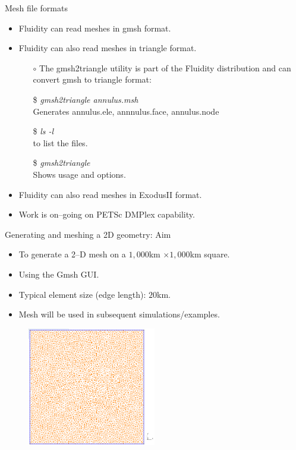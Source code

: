 \documentclass[t]{beamer}
\begin{document}
\begin{frame}{Mesh file formats}
   \begin{itemize}
      \item Fluidity can read meshes in gmsh format.\vspace{10pt}
      \item Fluidity can also read meshes in triangle format.
      \begin{itemize}
         \item[$\circ$] The gmsh2triangle utility is part of the Fluidity distribution and can convert gmsh to triangle format:
         \item[\$] \emph{gmsh2triangle annulus.msh} \\ \hspace{10pt} Generates annulus.ele, annnulus.face, annulus.node
         \item[\$] \emph{ls -l} \\ \hspace{10pt} to list the files.
         \item[\$] \emph{gmsh2triangle} \\ \hspace{10pt} Shows usage and options.\vspace{10pt}
      \end{itemize}
      \item Fluidity can also read meshes in ExodusII format.\vspace{10pt}
      \item Work is on--going on PETSc DMPlex capability.
   \end{itemize}
\end{frame}

\begin{frame}{Generating and meshing a 2D geometry: Aim}

\begin{itemize}
    \item To generate a 2--D mesh on a $1,000$km $\times 1,000$km square.
    \item Using the Gmsh GUI.
    \item Typical element size (edge length): $20$km.
    \item Mesh will be used in subsequent simulations/examples.
\end{itemize}

\begin{figure}[htbp]
 \centering
  \includegraphics[width=0.5\textwidth]{../figures/2d-example-mesh}
\end{figure}

\end{frame}
\end{document}
